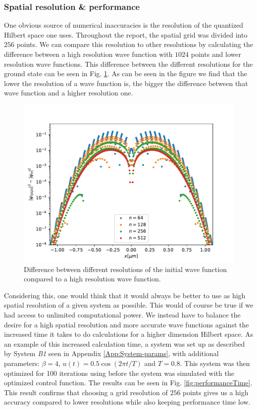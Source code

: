 \documentclass[a4paper, twocolumn]{revtex4-1}
\begin{document}
\subsubsection{Spatial resolution \& performance}
One obvious source of numerical inaccuracies is the resolution of the quantized Hilbert space one uses. Throughout the report, the spatial grid was divided into $256$ points. We can compare this resolution to other resolutions by calculating the difference between a high resolution wave function with $1024$ points and lower resolution wave functions. This difference between the different resolutions for the ground state can be seen in Fig. \ref{fig:groundstateGrid}. As can be seen in the figure we find that the lower the resolution of a wave function is, the bigger the difference between that wave function and a higher resolution one. \\
\begin{figure}
	\includegraphics[width=\columnwidth]{graphics/stateAnalysis/GroundstateGrid.pdf}
	\caption{Difference between different resolutions of the initial wave function compared to a high resolution wave function.}
	\label{fig:groundstateGrid}
\end{figure}

Considering this, one would think that it would always be better to use as high spatial resolution of a given system as possible. This would of course be true if we had access to unlimited computational power. We instead have to balance the desire for a high spatial resolution and more accurate wave functions against the increased time it takes to do calculations for a higher dimension Hilbert space. As an example of this increased calculation time, a system was set up as described by System \textit{B1} seen in Appendix \ref{App:System-params}, with additional parameters: $\beta = 4$, $u(t)=0.5 \cos(2\pi t/T)$ and $T=0.8$. This system was then optimized for 100 iterations using  before the system was simulated with the optimized control function. The results can be seen in Fig. \ref{fig:performanceTime}. This result confirms that choosing a grid resolution of $256$ points gives us a high accuracy compared to lower resolutions while also keeping performance time low.
\end{document}
